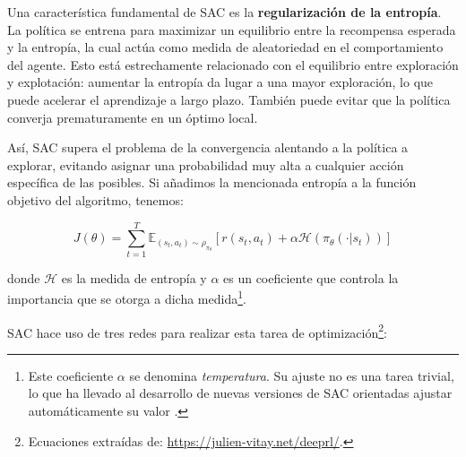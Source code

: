 Una característica fundamental de SAC es la \textbf{regularización de la entropía}. La política se entrena para maximizar un equilibrio entre la recompensa esperada y la entropía, la cual actúa como medida de aleatoriedad en el comportamiento del agente. Esto está estrechamente relacionado con el equilibrio entre exploración y explotación: aumentar la entropía da lugar a una mayor exploración, lo que puede acelerar el aprendizaje a largo plazo. También puede evitar que la política converja prematuramente en un óptimo local. 

Así, SAC supera el problema de la convergencia alentando a la política a explorar, evitando asignar una probabilidad muy alta a cualquier acción específica de las posibles. Si añadimos la mencionada entropía a la función objetivo del algoritmo, tenemos:

\begin{equation}
    J(\theta) = \sum_{t=1}^{T} \mathds{E}_{(s_t,a_t) \sim \rho_{\pi_\theta}}[r(s_t,a_t) + \alpha \mathcal{H}(\pi_\theta(\cdot|s_t))]
\end{equation}

donde $\mathcal{H}$ es la medida de entropía y $\alpha$ es un coeficiente que controla la importancia que se otorga a dicha medida\footnote{Este coeficiente $\alpha$ se denomina \textit{temperatura}. Su ajuste no es una tarea trivial, lo que ha llevado al desarrollo de nuevas versiones de SAC orientadas ajustar automáticamente su valor \cite{haarnoja2018soft}.}.

SAC hace uso de tres redes para realizar esta tarea de optimización\footnote{Ecuaciones extraídas de: \url{https://julien-vitay.net/deeprl/}.}:

